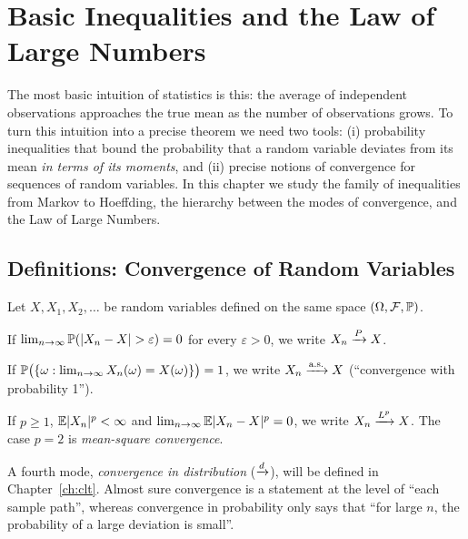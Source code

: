 \documentclass[main.tex]{subfiles}
\begin{document}
\chapter{Basic Inequalities and the Law of Large Numbers}\label{ch:esitsizlikler}

The most basic intuition of statistics is this: the average of independent observations approaches the true mean as the number of observations grows. To turn this intuition into a precise theorem we need two tools: (i) probability inequalities that bound the probability that a random variable deviates from its mean \emph{in terms of its moments}, and (ii) precise notions of convergence for sequences of random variables. In this chapter we study the family of inequalities from Markov to Hoeffding, the hierarchy between the modes of convergence, and the Law of Large Numbers.

\section{Definitions: Convergence of Random Variables}

Let $X,X_1,X_2,\dots$ be random variables defined on the same space $(\Omega,\F,\P)$.

\begin{definition}
If $\lim_{n\to\infty}\P(|X_n-X|>\varepsilon)=0$ for every $\varepsilon>0$, we write $X_n\pto X$.
\end{definition}

\begin{definition}
If $\P\big(\{\omega: \lim_{n\to\infty}X_n(\omega)=X(\omega)\}\big)=1$, we write $X_n\asto X$ (``convergence with probability 1'').
\end{definition}

\begin{definition}
If $p\ge1$, $\E|X_n|^p<\infty$ and $\lim_{n\to\infty}\E|X_n-X|^p=0$, we write $X_n\Lto{p}X$. The case $p=2$ is \emph{mean-square convergence}.
\end{definition}

\begin{remark}
A fourth mode, \emph{convergence in distribution} ($\dto$), will be defined in Chapter~\ref{ch:clt}. Almost sure convergence is a statement at the level of ``each sample path'', whereas convergence in probability only says that ``for large $n$, the probability of a large deviation is small''.
\end{remark}
\end{document}
